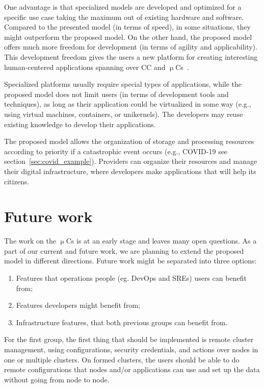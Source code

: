 One advantage is that specialized models are developed and optimized for a specific use case taking the maximum out of existing hardware and software. Compared to the presented model (in terms of speed), in some situations, they might outperform the proposed model. On the other hand, the proposed model offers much more freedom for development (in terms of agility and applicability). This development freedom gives the users a new platform for creating interesting human-centered applications spanning over CC and $\upmu$Cs~\cite{VillariCF17}.

Specialized platforms usually require special types of applications, while the proposed model does not limit users (in terms of development tools and techniques), as long as their application could be virtualized in some way (e.g., using virtual machines, containers, or unikernels). The developers may reuse existing knowledge to develop their applications.

The proposed model allows the organization of storage and processing resources according to priority if a catastrophic event occurs (e.g., COVID-19 see section~\ref{sec:covid_example}). Providers can organize their resources and manage their digital infrastructure, where developers make applications that will help its citizens.
%
%
\section{Future work}\label{sec:future_work}
%
The work on the $\upmu$Cs is at an early stage and leaves many open questions. As a part of our current and future work, we are planning to extend the proposed model in different directions. Future work might be separated into three options:
 
\begin{enumerate}[start=1,label={(\bfseries \arabic*)}]
	\item Features that operations people (eg. DevOps and SREs) users can benefit from;
	\item Features developers might benefit from;
	\item Infrastructure features, that both previous groups can benefit from.
\end{enumerate}

\noindent
For the first group, the first thing that should be implemented is remote cluster management, using configurations, security credentials, and actions over nodes in one or multiple clusters. On formed clusters, the users should be able to do remote configurations that nodes and/or applications can use and set up the data without going from node to node.

